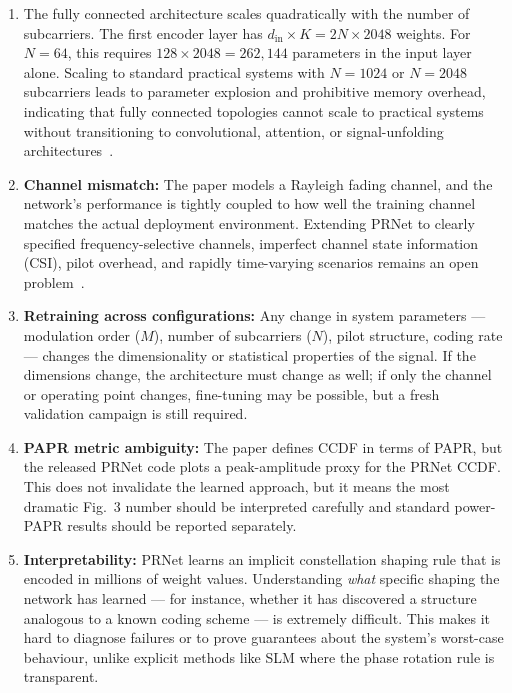 \begin{enumerate}
    \item The fully connected architecture scales quadratically with the number of subcarriers. The first encoder layer has $d_{\mathrm{in}} \times K = 2N \times 2048$ weights. For $N = 64$, this requires $128 \times 2048 = 262{,}144$ parameters in the input layer alone. Scaling to standard practical systems with $N = 1024$ or $N = 2048$ subcarriers leads to parameter explosion and prohibitive memory overhead, indicating that fully connected topologies cannot scale to practical systems without transitioning to convolutional, attention, or signal-unfolding architectures~\cite{kim2017novel}.
    \item \textbf{Channel mismatch:} The paper models a Rayleigh fading channel, and the network's performance is tightly coupled to how well the training channel matches the actual deployment environment.  Extending PRNet to clearly specified frequency-selective channels, imperfect channel state information (CSI), pilot overhead, and rapidly time-varying scenarios remains an open problem~\cite{kim2017novel}.
    \item \textbf{Retraining across configurations:} Any change in system parameters --- modulation order ($M$), number of subcarriers ($N$), pilot structure, coding rate --- changes the dimensionality or statistical properties of the signal. If the dimensions change, the architecture must change as well; if only the channel or operating point changes, fine-tuning may be possible, but a fresh validation campaign is still required.
    \item \textbf{PAPR metric ambiguity:} The paper defines CCDF in terms of PAPR, but the released PRNet code plots a peak-amplitude proxy for the PRNet CCDF.  This does not invalidate the learned approach, but it means the most dramatic Fig.~3 number should be interpreted carefully and standard power-PAPR results should be reported separately.
    \item \textbf{Interpretability:} PRNet learns an implicit constellation shaping rule that is encoded in millions of weight values.  Understanding \emph{what} specific shaping the network has learned --- for instance, whether it has discovered a structure analogous to a known coding scheme --- is extremely difficult.  This makes it hard to diagnose failures or to prove guarantees about the system's worst-case behaviour, unlike explicit methods like SLM where the phase rotation rule is transparent.
\end{enumerate}


